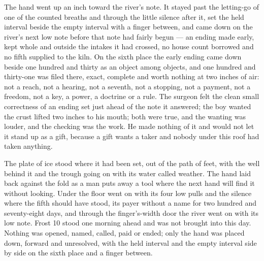 The hand went up an inch toward the river's note. It stayed past the letting-go of one of the counted breaths and through the little silence after it, set the held interval beside the empty interval with a finger between, and came down on the river's next low note before that note had fairly begun --- an ending made early, kept whole and outside the intakes it had crossed, no house count borrowed and no fifth supplied to the kiln. On the sixth place the early ending came down beside one hundred and thirty as an object among objects, and one hundred and thirty-one was filed there, exact, complete and worth nothing at two inches of air: not a reach, not a hearing, not a seventh, not a stopping, not a payment, not a freedom, not a key, a power, a doctrine or a rule. The surgeon felt the clean small correctness of an ending set just ahead of the note it answered; the boy wanted the crust lifted two inches to his mouth; both were true, and the wanting was louder, and the checking was the work. He made nothing of it and would not let it stand up as a gift, because a gift wants a taker and nobody under this roof had taken anything.

The plate of ice stood where it had been set, out of the path of feet, with the well behind it and the trough going on with its water called weather. The hand laid back against the fold as a man puts away a tool where the next hand will find it without looking. Under the floor  went on with its four low pulls and the silence where the fifth should have stood, its payer without a name for two hundred and seventy-eight days, and through the finger's-width door the river went on with its low note. Frost 10 stood one morning ahead and was not brought into this day. Nothing was opened, named, called, paid or ended; only the hand was placed down, forward and unresolved, with the held interval and the empty interval side by side on the sixth place and a finger between.
